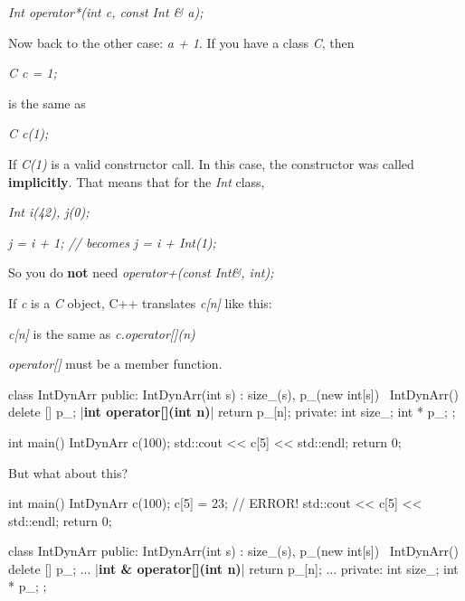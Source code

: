 \textit{Int operator*(int c, const Int \& a);}

Now back to the other case: \textit{a + 1}. If you have a class \textit{C},
then

\textit{C c = 1;}

is the same as

\textit{C c(1);}

If \textit{C(1)} is a valid constructor call. In this case, the
constructor was called \textbf{implicitly}. That means that for the
\textit{Int} class,

\textit{Int i(42), j(0);}

\textit{j = i + 1; // becomes j = i + Int(1);}

So you do \textbf{not} need \textit{operator+(const Int\&, int);}



\newpage{}

If \textit{c} is a \textit{C} object, C++ translates \textit{c[n]} like
this:

\textit{c[n]} is the same as \textit{c.operator[](n)}

\textit{operator[]} must be a member function.

\begin{consolethree}[escapeinside=||]
class IntDynArr
{
public:
    IntDynArr(int s)
        : size_(s), p_(new int[s])
    {}
    ~IntDynArr() { delete [] p_; }
    |{\bf int operator[](int n)}| { return p_[n]; }
private:
    int size_;
    int * p_;
};
\end{consolethree}

\begin{consolethree}[escapeinside=||]
int main()
{
    IntDynArr c(100);
    std::cout << c[5] << std::endl;
    return 0;
}
\end{consolethree}

But what about this?

\begin{consolethree}[escapeinside=||]
int main()
{
    IntDynArr c(100);
    c[5] = 23; // ERROR!
    std::cout << c[5] << std::endl;
    return 0;
}
\end{consolethree}

\begin{consolethree}[escapeinside=||]
class IntDynArr
{
public:
    IntDynArr(int s)
        : size_(s), p_(new int[s])
    {}
    ~IntDynArr() { delete [] p_; }
    ...
    |{\bf int \& operator[](int n)}|
    {
        return p_[n];
    }
    ...
private:
    int size_;
    int * p_;
};
\end{consolethree}

